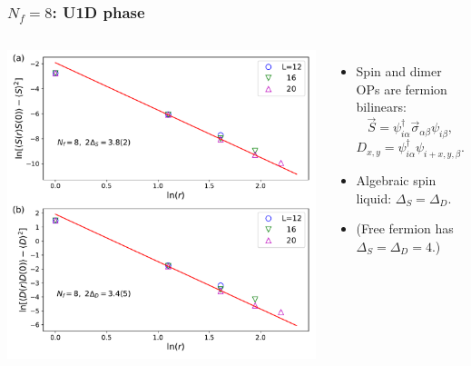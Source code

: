 \documentclass[xcolor=table, 10pt, aspectratio=43]{beamer}
\begin{document}
\begin{frame}
  \frametitle{$N_f=8$: U1D phase}
  \begin{columns}
    \includegraphics[width=\textwidth]{../u1sl/n8decay}
		\begin{itemize}
			\item Spin and dimer OPs are fermion bilinears:
			\[\vec S = \psi^\dagger_{i\alpha}\vec\sigma_{\alpha\beta}\psi_{i\beta},\]
			\[D_{x,y} = \psi^\dagger_{i\alpha}\psi_{i+x,y,\beta}.\]
			\item Algebraic spin liquid: $\Delta_S = \Delta_D$.
		  \item (Free fermion has $\Delta_S=\Delta_D = 4$.)
		\end{itemize}
  \end{columns}
\end{frame}
\end{document}
